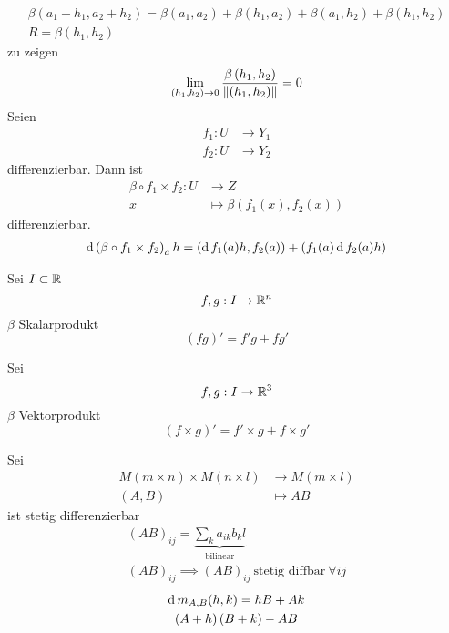 \begin{Bew}
  \begin{gather*}
    \beta\left( a_1+h_1, a_2+h_2\right)=\beta\left( a_1,a_2 \right)+\beta\left( h_1,a_2 \right)+\beta\left( a_1,h_2 \right)+\beta\left( h_1,h_2 \right)\\
    R=\beta\left( h_1,h_2 \right)
  \end{gather*}
  zu zeigen
  \[\displaystyle\lim_{\left( h_1,h_2 \right)\rightarrow0}\frac{\beta\left( h_1,h_2 \right)}{\left\| \left( h_1,h_2 \right) \right\|}=0\]
  Seien
  \begin{align*}
    f_1:U&\to Y_1\\
    f_2:U&\to Y_2
  \end{align*}
  differenzierbar. Dann ist
  \begin{align*}
    \beta\circ f_1\times f_2:U&\to Z\\
    x&\mapsto \beta\left( f_1(x),f_2(x) \right)
  \end{align*}
  differenzierbar.
  \begin{gather*}
    \operatorname{d}\left( \beta\circ f_1\times f_2 \right)_ah=\left( \operatorname{d} f_1(a)h,f_2(a) \right)+\left( f_1(a)\operatorname{d} f_2(a)h \right)
  \end{gather*}
\end{Bew}
\begin{Bsp}
  Sei $I\subset\mathbb{R}$
  \[f,g:I\to\mathbb{R}^n\]
  $\beta$ Skalarprodukt
  \[\left( fg \right)'=f'g+fg'\]
\end{Bsp}
\begin{Bsp}
  Sei
  \[f,g:I\to\mathbb{R}^3\]
  $\beta$ Vektorprodukt
  \[\left( f\times g \right)'=f'\times g+f\times g'\]
\end{Bsp}
\begin{Bsp}
  Sei
  \begin{align*}
    M(m\times n)\times M(n\times l)&\to M(m\times l)\\
    \left( A,B \right)&\mapsto AB
  \end{align*}
  ist stetig differenzierbar
  \begin{gather*}
    \left( AB \right)_{ij}=\underbrace{\sum_ka_{ik}b_kl}_{\text{bilinear}}\\
    \left( AB \right)_{ij}\implies\left( AB \right)_{ij}\ \text{stetig diffbar}\ \forall ij
  \end{gather*}
  \begin{gather*}
    \operatorname{d} m_{A,B}(h,k)=hB+Ak\\
    \left( A+h \right)\left( B+k \right)-AB
  \end{gather*}
\end{Bsp}
